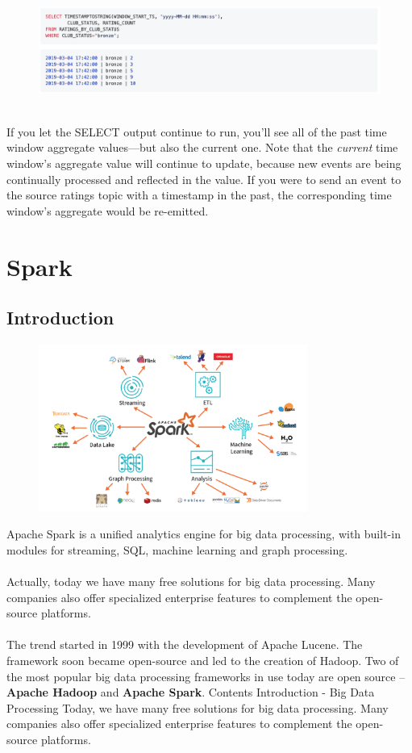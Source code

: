 \documentclass[10pt,a4paper]{article}
\newcommand{\nline}{\\~\\}
\begin{document}
\begin{enumerate}
   \begin{figure}[ht!]
 \hfill \includegraphics[width=400pt]{images/ksql-cmd24}\hspace*{\fill}
 \end{figure} \\
 If you let the SELECT output continue to run, you’ll see all of the past time window aggregate values—but also the current one. Note that the \textit{current} time window’s aggregate value will continue to update, because new events are being continually processed and reflected in the value. If you were to send an event to the source ratings topic with a timestamp in the past, the corresponding time window’s aggregate would be re-emitted.
 \end{enumerate}
 
 \pagebreak
 
 \section{Spark}
 \subsection{Introduction}
    \begin{figure}[ht!]
 \hfill \includegraphics[width=250pt]{images/spark-intro}\hspace*{\fill}
 \end{figure} 
 Apache Spark is a unified analytics engine for big data processing, with built-in modules for streaming, SQL, machine learning and graph processing.
 \nline
Actually, today we have many free solutions for big data processing. Many companies also offer specialized enterprise features to complement the open-source platforms.
\nline
The trend started in 1999 with the development of Apache Lucene. The framework soon became open-source and led to the creation of Hadoop. Two of the most popular big data processing frameworks in use today are open source – \textbf{Apache Hadoop} and \textbf{Apache Spark}. 
Contents
Introduction - Big Data Processing
Today, we have many free solutions for big data processing. Many companies also offer specialized enterprise features to complement the open-source platforms.
\end{document}
